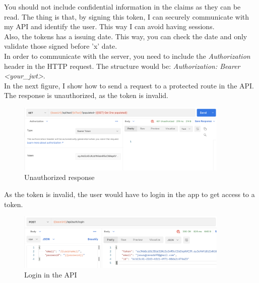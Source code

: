         You should not include confidential information in the claims as they can be read. The thing is that, by signing this token, I can securely communicate with my API and identify the user. This way I can avoid having sessions. \\
        Also, the tokens has a issuing date. This way, you can check the date and only validate those signed before 'x' date. \\

        In order to communicate with the server, you need to include the \textit{Authorization} header in the HTTP request. The structure would be: \textit{Authorization: Bearer <your\_jwt>}. \\

        In the next figure, I show how to send a request to a protected route in the API. The response is unauthorized, as the token is invalid. \\
        \begin{figure}[H]
            \centering
                \includegraphics[width=0.9\textwidth]{assets/unauthorized.png}
            \caption{Unauthorized response}
            \label{fig:user_unauthorized}
        \end{figure}

        As the token is invalid, the user would have to login in the app to get access to a token. \\
        \begin{figure}[H]
            \centering
                \includegraphics[width=0.9\textwidth]{assets/login.png}
            \caption{Login in the API}
            \label{fig:user_login_api}
        \end{figure}

